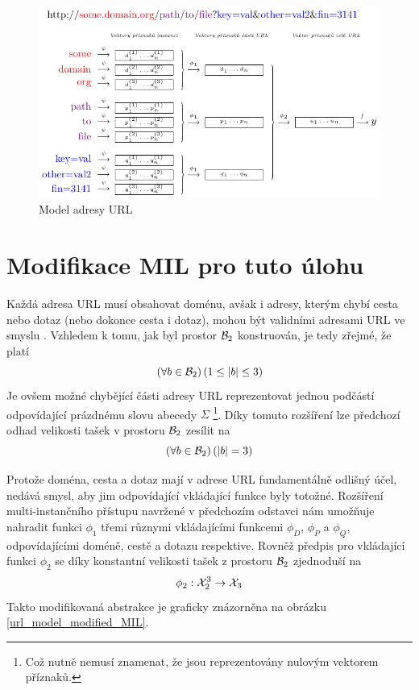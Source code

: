 \begin{figure}[h]
	\centering
	\includegraphics{images/model_MIL/model_MIL.pdf}
	\caption{Model adresy URL}\label{url_model_MIL}
\end{figure}

\section{Modifikace MIL pro tuto úlohu}\label{MIL-modification}
Každá adresa URL musí obsahovat doménu, avšak i adresy, kterým chybí cesta nebo dotaz (nebo dokonce cesta i dotaz), mohou být validními adresami URL ve smyslu \cite{berners-lee_uniform_1994}. Vzhledem k tomu, jak byl prostor \( \mathcal B_2 \) konstruován, je tedy zřejmé, že platí
\[ \left( \forall b \in \mathcal B_2 \right) \left( 1 \leq \left| b \right| \leq 3 \right) \]
Je ovšem možné chybějící části adresy URL reprezentovat jednou podčástí odpovídající prázdnému slovu abecedy \( \Sigma \) \footnote{Což nutně nemusí znamenat, že jsou reprezentovány nulovým vektorem příznaků.}. Díky tomuto rozšíření lze předchozí odhad velikosti tašek v prostoru \( \mathcal B_2 \) zesílit na
\[ \left( \forall b \in \mathcal B_2 \right) \left( \left| b \right| = 3 \right) \]

Protože doména, cesta a dotaz mají v adrese URL fundamentálně odlišný účel, nedává smysl, aby jim odpovídající vkládající funkce byly totožné. Rozšíření multi-instančního přístupu navržené v předchozím odstavci nám umožňuje nahradit funkci \( \phi_1 \) třemi různymi vkládajícími funkcemi \( \phi_D \), \( \phi_P \) a \( \phi_Q \), odpovídajícími doméně, cestě a dotazu respektive. Rovněž předpis pro vkládající funkci \( \phi_2 \) se díky konstantní velikosti tašek z prostoru \( \mathcal B_2 \) zjednoduší na
\[ \phi_2 : \mathcal X_2^3 \to \mathcal X_3 \]
Takto modifikovaná abstrakce je graficky znázorněna na obrázku \ref{url_model_modified_MIL}.

